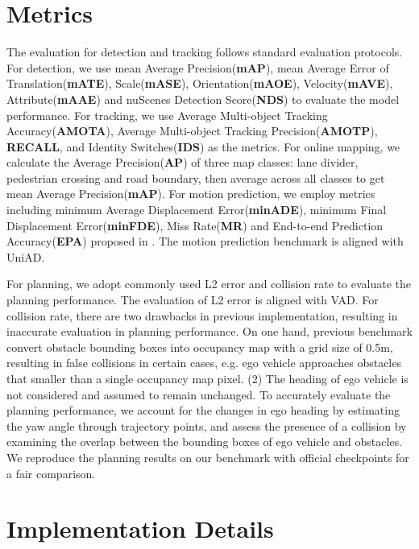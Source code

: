 \appendix

\section{Metrics} \label{app:metric}
The evaluation for detection and tracking follows standard evaluation protocols\cite{nuscenes}. For detection, we use mean Average Precision(\textbf{mAP}), mean Average Error of
Translation(\textbf{mATE}), Scale(\textbf{mASE}), Orientation(\textbf{mAOE}), Velocity(\textbf{mAVE}), Attribute(\textbf{mAAE}) and nuScenes Detection Score(\textbf{NDS}) to evaluate the model performance. For tracking, we use Average Multi-object Tracking Accuracy(\textbf{AMOTA}), Average Multi-object Tracking Precision(\textbf{AMOTP}), \textbf{RECALL}, and Identity Switches(\textbf{IDS}) as the metrics. For online mapping, we calculate the Average Precision(\textbf{AP}) of three map classes: lane divider, pedestrian crossing and road boundary, then average across all classes to get mean Average Precision(\textbf{mAP}). For motion prediction, we employ metrics including minimum Average Displacement Error(\textbf{minADE}), minimum Final Displacement Error(\textbf{minFDE}), Miss Rate(\textbf{MR}) and End-to-end Prediction Accuracy(\textbf{EPA}) proposed in \cite{vip3d}. The motion prediction benchmark is aligned with UniAD\cite{uniad}.

For planning, we adopt commonly used L2 error and collision rate to evaluate the planning performance. The evaluation of L2 error is aligned with VAD\cite{vad}. For collision rate, there are two drawbacks in previous \cite{uniad, vad} implementation, resulting in inaccurate evaluation in planning performance. On one hand, previous benchmark convert obstacle bounding boxes into occupancy map with a grid size of 0.5m, resulting in false collisions in certain cases, e.g. ego vehicle approaches obstacles that smaller than a single occupancy map pixel\cite{admlp}. (2) The heading of ego vehicle is not considered and assumed to remain unchanged\cite{ego}. To accurately evaluate the planning performance, we account for the changes in ego heading by estimating the yaw angle through trajectory points, and assess the presence of a collision by examining the overlap between the bounding boxes of ego vehicle and obstacles. We reproduce the planning results on our benchmark with official checkpoints\cite{uniad, vad} for a fair comparison.

\section{Implementation Details} \label{app:imp_detail}
